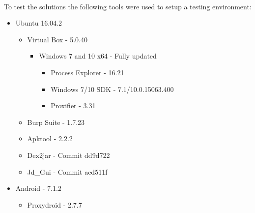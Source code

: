 \paragraph{}
To test the solutions the following tools were used to setup a testing environment:
\begin{itemize}
    \item Ubuntu 16.04.2
    \begin{itemize}
        \item Virtual Box - 5.0.40
        \begin{itemize}
            \item Windows 7 and 10 x64 - Fully updated
            \begin{itemize}
                \item Process Explorer - 16.21
                \item Windows 7/10 SDK - 7.1/10.0.15063.400
                \item Proxifier - 3.31
            \end{itemize}
        \end{itemize}
        \item Burp Suite - 1.7.23
        \item Apktool - 2.2.2
        \item Dex2jar - Commit dd9d722
        \item Jd\_Gui - Commit acd511f
    \end{itemize}
    \item Android - 7.1.2
    \begin{itemize}
        \item Proxydroid - 2.7.7
    \end{itemize}
\end{itemize}


